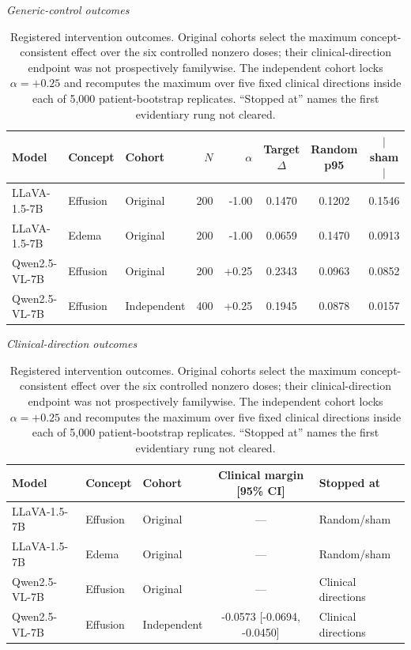 \begin{table}[t]
\centering
\scriptsize
\setlength{\tabcolsep}{3.2pt}
\caption{Registered intervention outcomes. Original cohorts select the maximum concept-consistent effect over the six controlled nonzero doses; their clinical-direction endpoint was not prospectively familywise. The independent cohort locks $\alpha=+0.25$ and recomputes the maximum over five fixed clinical directions inside each of 5,000 patient-bootstrap replicates. ``Stopped at'' names the first evidentiary rung not cleared.}
\label{tab:gates}
\textit{Generic-control outcomes}\\[2pt]
\begin{tabular*}{\textwidth}{@{\extracolsep{\fill}}lllrrccc@{}}
\toprule
Model & Concept & Cohort & $N$ & $\alpha$ & Target $\Delta$ & Random p95 & $|$sham$|$ \\
\midrule
LLaVA-1.5-7B & Effusion & Original & 200 & -1.00 & 0.1470 & 0.1202 & 0.1546 \\
LLaVA-1.5-7B & Edema & Original & 200 & -1.00 & 0.0659 & 0.1470 & 0.0913 \\
Qwen2.5-VL-7B & Effusion & Original & 200 & +0.25 & 0.2343 & 0.0963 & 0.0852 \\
Qwen2.5-VL-7B & Effusion & Independent & 400 & +0.25 & 0.1945 & 0.0878 & 0.0157 \\
\bottomrule
\end{tabular*}
\medskip

\textit{Clinical-direction outcomes}\\[2pt]
\begin{tabular*}{\textwidth}{@{\extracolsep{\fill}}lllcl@{}}
\toprule
Model & Concept & Cohort & Clinical margin [95\% CI] & Stopped at \\
\midrule
LLaVA-1.5-7B & Effusion & Original & --- & Random/sham \\
LLaVA-1.5-7B & Edema & Original & --- & Random/sham \\
Qwen2.5-VL-7B & Effusion & Original & --- & Clinical directions \\
Qwen2.5-VL-7B & Effusion & Independent & -0.0573 [-0.0694, -0.0450] & Clinical directions \\
\bottomrule
\end{tabular*}
\end{table}
